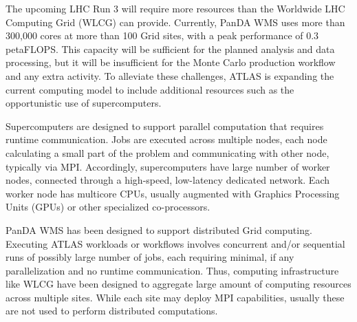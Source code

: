 The upcoming LHC Run 3 will require more resources than the Worldwide LHC
Computing Grid (WLCG) can provide. Currently, PanDA WMS uses more than
300,000 cores at more than 100 Grid sites, with a peak performance of 0.3
petaFLOPS\@. This capacity will be sufficient for the planned analysis and
data processing, but it will be insufficient for the Monte Carlo production
workflow and any extra activity. To alleviate these challenges, ATLAS is
expanding the current computing model to include additional resources such as
the opportunistic use of supercomputers.

Supercomputers are designed to support parallel computation that
requires runtime communication. Jobs are executed across multiple nodes, each
node calculating a small part of the problem and communicating with other
node, typically via MPI\@. Accordingly, supercomputers have large number of worker
nodes, connected through a high-speed, low-latency dedicated network. Each
worker node has multicore CPUs, usually augmented with Graphics Processing
Units (GPUs) or other specialized co-processors.

PanDA WMS has been designed to support distributed Grid computing. Executing
ATLAS workloads or workflows involves concurrent and/or sequential runs of
possibly large number of jobs, each requiring minimal, if any parallelization
and no runtime communication. Thus, computing infrastructure like WLCG have
been designed to aggregate large amount of computing resources across
multiple sites. While each site may deploy MPI capabilities, usually these
are not used to perform distributed computations.

